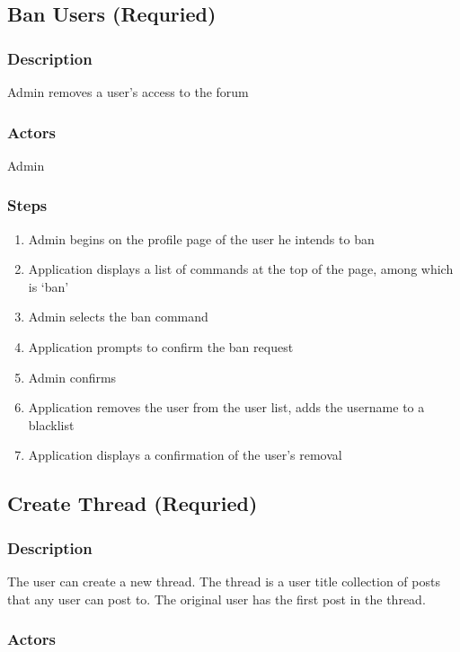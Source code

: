 \documentclass[12pt]{scrartcl}
\begin{document}
\subsection{Ban Users (Requried)}
\subsubsection{Description}
 
Admin removes a user’s access to the forum
 
\subsubsection{Actors}
 
Admin
 
\subsubsection{Steps}

\begin{enumerate}
\item Admin begins on the profile page of the user he intends to ban
\item Application displays a list of commands at the top of the page, among which is ‘ban’
\item Admin selects the ban command
\item Application prompts to confirm the ban request
\item Admin confirms
\item Application removes the user from the user list, adds the username to a blacklist
\item Application displays a confirmation of the user’s removal

\end {enumerate}

\subsection{Create Thread (Requried)}
\subsubsection{Description}

The user can create a new thread. The thread is a user title collection of posts that any user can post to. The original user has the first post in the thread.

\subsubsection{Actors}
\end{document}
